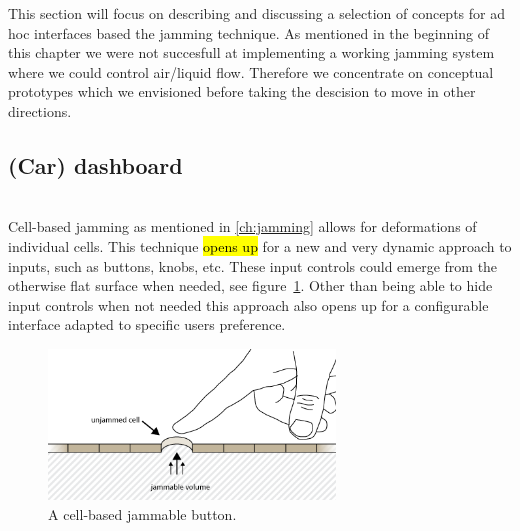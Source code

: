 This section will focus on describing and discussing a selection of concepts for ad hoc interfaces based the jamming technique.
As mentioned in the beginning of this chapter we were not succesfull at implementing a working jamming system where we could control air/liquid flow. 
Therefore we concentrate on conceptual prototypes which we envisioned before taking the descision to move in other directions.

\subsection{(Car) dashboard} 

\\

Cell-based jamming as mentioned in \ref{ch:jamming} allows for deformations of individual cells.
This technique \hl{opens up} for a new and very dynamic approach to inputs, such as buttons, knobs, etc.
These input controls could emerge from the otherwise flat surface when needed, see figure~\ref{fig:ch:jamming:concepts:button}.
Other than being able to hide input controls when not needed this approach also opens up for a configurable interface adapted to specific users preference.

\begin{figure}[h]
  \centering
      \includegraphics[width=3in]{figures/jamming/concepts/button}
  \caption[A cell-based jammable button.]
  {A cell-based jammable button.}
  \label{fig:ch:jamming:concepts:button}
\end{figure}


